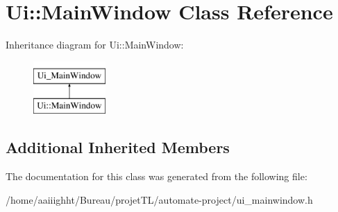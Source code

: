 \hypertarget{class_ui_1_1_main_window}{\section{Ui\-:\-:Main\-Window Class Reference}
\label{class_ui_1_1_main_window}
}
Inheritance diagram for Ui\-:\-:Main\-Window\-:\begin{figure}[H]
\begin{center}
\leavevmode
\includegraphics[height=2.000000cm]{class_ui_1_1_main_window}
\end{center}
\end{figure}
\subsection*{Additional Inherited Members}


The documentation for this class was generated from the following file\-:\begin{DoxyCompactItemize}
\item 
/home/aaiiighht/\-Bureau/projet\-T\-L/automate-\/project/ui\-\_\-mainwindow.\-h\end{DoxyCompactItemize}
